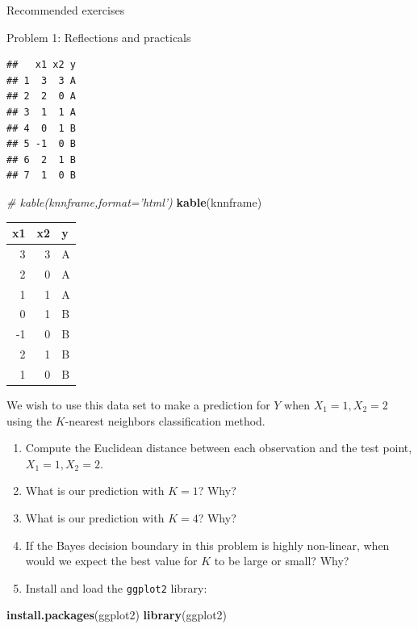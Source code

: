 \documentclass[ignorenonframetext,]{beamer}
\newenvironment{Shaded}{\begin{snugshade}}{\end{snugshade}}
\newcommand{\KeywordTok}[1]{\textcolor[rgb]{0.13,0.29,0.53}{\textbf{#1}}}
\newcommand{\CommentTok}[1]{\textcolor[rgb]{0.56,0.35,0.01}{\textit{#1}}}
\newcommand{\NormalTok}[1]{#1}
\providecommand{\tightlist}{%
  \setlength{\itemsep}{0pt}\setlength{\parskip}{0pt}}
\begin{document}
\begin{frame}[fragile]{Recommended exercises}
\begin{block}{Problem 1: Reflections and practicals}
\begin{verbatim}
##   x1 x2 y
## 1  3  3 A
## 2  2  0 A
## 3  1  1 A
## 4  0  1 B
## 5 -1  0 B
## 6  2  1 B
## 7  1  0 B
\end{verbatim}

\begin{Shaded}
\begin{Highlighting}[]
\CommentTok{# kable(knnframe,format='html')}
\KeywordTok{kable}\NormalTok{(knnframe)}
\end{Highlighting}
\end{Shaded}

\begin{tabular}{r|r|l}
\hline
x1 & x2 & y\\
\hline
3 & 3 & A\\
\hline
2 & 0 & A\\
\hline
1 & 1 & A\\
\hline
0 & 1 & B\\
\hline
-1 & 0 & B\\
\hline
2 & 1 & B\\
\hline
1 & 0 & B\\
\hline
\end{tabular}

We wish to use this data set to make a prediction for \(Y\) when
\(X_1=1, X_2=2\) using the \(K\)-nearest neighbors classification
method.

\begin{enumerate}
\def\labelenumi{\alph{enumi}.}
\tightlist
\item
  Compute the Euclidean distance between each observation and the test
  point, \(X_1=1,X_2=2\).
\item
  What is our prediction with \(K=1\)? Why?
\item
  What is our prediction with \(K=4\)? Why?
\item
  If the Bayes decision boundary in this problem is highly non-linear,
  when would we expect the best value for \(K\) to be large or small?
  Why?
\item
  Install and load the \texttt{ggplot2} library:
\end{enumerate}

\begin{Shaded}
\begin{Highlighting}[]
\KeywordTok{install.packages}\NormalTok{(ggplot2)}
\KeywordTok{library}\NormalTok{(ggplot2)}
\end{Highlighting}
\end{Shaded}


\end{block}
\end{frame}
\end{document}
